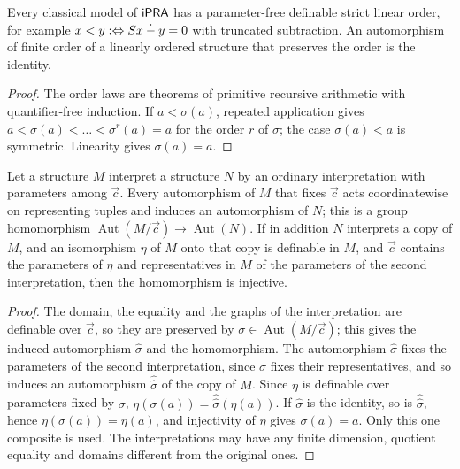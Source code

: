 \begin{lemma}
\label{obs:lem:rigid}
Every classical model of $\mathsf{iPRA}$ has a parameter-free definable strict linear
order, for example
$x<y\mathrel{:\Leftrightarrow}S x\mathbin{\dot{-}}y=0$ with truncated subtraction. An
automorphism of finite order of a linearly ordered structure that preserves the
order is the identity.
\end{lemma}

\begin{proof}
The order laws are theorems of primitive recursive arithmetic with
quantifier-free induction. If $a<\sigma(a)$, repeated application gives
$a<\sigma(a)<\dots<\sigma^{r}(a)=a$ for the order $r$ of $\sigma$; the case
$\sigma(a)<a$ is symmetric. Linearity gives $\sigma(a)=a$.
\end{proof}

\begin{lemma}
\label{obs:lem:aut}
Let a structure $M$ interpret a structure $N$ by an ordinary interpretation
with parameters among $\vec c$. Every automorphism of $M$ that fixes $\vec c$
acts coordinatewise on representing tuples and induces an automorphism of $N$;
this is a group homomorphism
$\operatorname{Aut}(M/\vec c)\to\operatorname{Aut}(N)$. If in addition $N$
interprets a copy of $M$, and an isomorphism $\eta$ of $M$ onto that copy is
definable in $M$, and $\vec c$ contains the parameters of $\eta$ and
representatives in $M$ of the parameters of the second interpretation, then the
homomorphism is injective.
\end{lemma}

\begin{proof}
The domain, the equality and the graphs of the interpretation are definable
over $\vec c$, so they are preserved by $\sigma\in\operatorname{Aut}(M/\vec c)$;
this gives the induced automorphism $\widehat\sigma$ and the homomorphism. The
automorphism $\widehat\sigma$ fixes the parameters of the second
interpretation, since $\sigma$ fixes their representatives, and so induces an
automorphism $\widehat{\widehat\sigma}$ of the copy of $M$. Since $\eta$ is
definable over parameters fixed by $\sigma$,
$\eta(\sigma(a))=\widehat{\widehat\sigma}(\eta(a))$. If $\widehat\sigma$ is the
identity, so is $\widehat{\widehat\sigma}$, hence $\eta(\sigma(a))=\eta(a)$,
and injectivity of $\eta$ gives $\sigma(a)=a$. Only this one composite is used.
The interpretations may have any finite dimension, quotient equality and
domains different from the original ones.
\end{proof}

